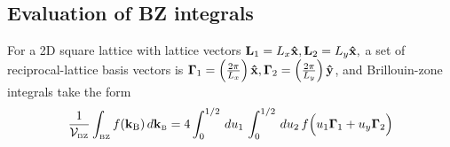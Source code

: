 \documentclass[letterpaper]{article}
\newcommand{\vbGamma}{\boldsymbol{\Gamma}}
\begin{document}
\subsection*{Evaluation of BZ integrals}

For a 2D square lattice with lattice vectors 
$\mathbf{L}_1=L_x\mathbf{\hat x}, \mathbf{L}_2=L_y\mathbf{\hat x},$
a set of reciprocal-lattice basis vectors is 
$\vbGamma_1=\pf{2\pi}{L_x} \vbhat{x},
 \vbGamma_2=\pf{2\pi}{L_y} \vbhat{y}$,
and Brillouin-zone integrals take the form
$$ \frac{1}{\mc V\subt{BZ}} 
   \int\subt{BZ} f(\vb k\subs{B}) \, d \vb k\subt{B}
  =4\int_0^{1/2} \, d u_1 \, \int_0^{1/2} \, d u_2 \, 
   f\Big( u_1\vbGamma_1 + u_y\vbGamma_2 \Big)
$$
\end{document}
